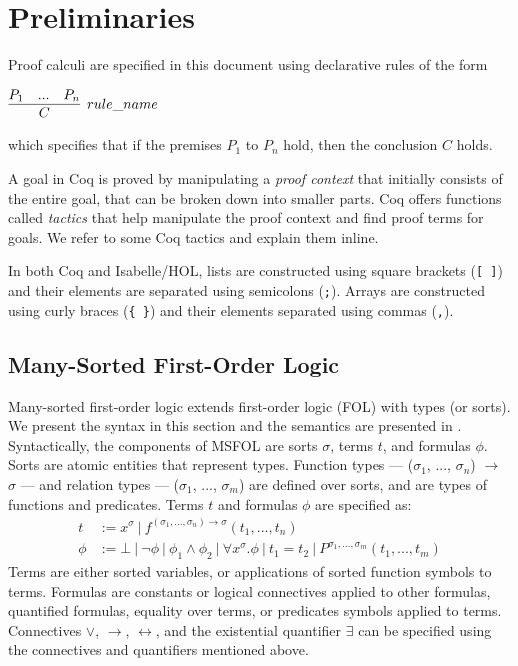 \documentclass{article}
\begin{document}
	\section{Preliminaries}
	\label{sec:prelims}
	Proof calculi are specified in this 
	document using declarative rules of 
	the form
	\begin{center}
		$\infer[rule\_name]{C}{P_1 & ... & P_n}$
	\end{center}
	which specifies that if the premises $P_1$ to 
	$P_n$ hold, then the conclusion $C$
	holds.
	
	A goal in Coq is proved by 
	manipulating a \emph{proof 
	context} that initially consists 
	of the entire goal, that can be 
	broken down into smaller parts. 
	Coq offers functions called 
	\textit{tactics} that help manipulate 
	the proof context and find proof 
	terms for goals. We refer
	to some Coq tactics and 
	explain them inline.
	
	In both Coq and Isabelle/HOL,
	lists are constructed using 
	square brackets (\texttt{[ ]})
	and their elements are separated 
	using semicolons (\texttt{;}). 
	Arrays are constructed using 
	curly braces (\texttt{\{ \}})
	and their elements separated 
	using commas (\texttt{,}). 
	
	\subsection{Many-Sorted First-Order Logic}
	\label{sec:msfol}
	Many-sorted first-order logic extends
	first-order logic (FOL) with 
	types (or sorts). We present the 
	syntax in this section and the 
	semantics are presented in
	\cite{Barrett2018}. Syntactically, 
	the components of MSFOL are sorts 
	$\sigma$, terms $t$, and 
	formulas $\phi$. Sorts are 
	atomic entities that 
	represent types. Function types 
	--- ($\sigma_1$, ..., $\sigma_n$) 
	$\to$ $\sigma$ ---
	and relation types 
	--- ($\sigma_1$, ..., $\sigma_m$)
	are defined over sorts, and 
	are types of functions and 
	predicates. Terms $t$ and 
	formulas $\phi$ are specified as:
	\begin{align*}
	t &:= x^{\sigma}\ |\ 
	f^{(\sigma_1, ..., \sigma_n) \to 
		\sigma}	(t_1, ..., t_n)\\
	\phi &:= \bot\ |\ \neg \phi\ |\ 
	\phi_1 \land \phi_2\ |\ \forall 
	x^{\sigma} . \phi\ |\ t_1 = t_2
	\ |\ P^{\sigma_1,...,\sigma_m}
	(t_1, ..., t_m)
	\end{align*}
	Terms are either sorted variables, 
	or applications of sorted function
	symbols to terms.
	Formulas are constants or logical 
	connectives applied to other 
	formulas, quantified formulas, 
	equality over terms, or predicates
	symbols applied to terms. Connectives 
	$\lor$, 
	$\to$, $\leftrightarrow$, and the 
	existential	quantifier $\exists$ 
	can be specified using the connectives 
	and quantifiers mentioned above.
	
\end{document}
